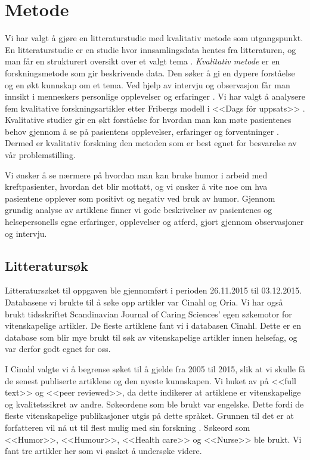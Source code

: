 \chapter{Metode}

Vi har valgt å gjøre en litteraturstudie med kvalitativ metode som
utgangspunkt. En litteraturstudie er en studie hvor innsamlingsdata hentes fra
litteraturen, og man får en strukturert oversikt over et valgt tema
\cite{segesten2006}.  \textit{Kvalitativ metode} er en forskningsmetode som gir
beskrivende data. Den søker å gi en dypere forståelse og en økt kunnskap om et
tema. Ved hjelp av intervju og observasjon får man innsikt i menneskers
personlige opplevelser og erfaringer \cite{olsson2003}. Vi har valgt å
analysere fem kvalitative forskningsartikler etter Fribergs modell i <<Dags för
uppsats>> \citeyear{friberg2006}. Kvalitative studier gir en økt forståelse for
hvordan man kan møte pasientenes behov gjennom å se på pasientens opplevelser,
erfaringer og forventninger \cite{segesten2006}. Dermed er kvalitativ forskning
den metoden som er best egnet for besvarelse av vår problemstilling.

Vi ønsker å se nærmere på hvordan man kan bruke humor i arbeid med
kreftpasienter, hvordan det blir mottatt, og vi ønsker å vite noe om hva
pasientene opplever som positivt og negativ ved bruk av humor. Gjennom grundig
analyse av artiklene finner vi gode beskrivelser av pasientenes og
helsepersonells egne erfaringer, opplevelser og atferd, gjort gjennom
observasjoner og intervju.

\section{Litteratursøk}

Litteratursøket til oppgaven ble gjennomført i perioden 26.11.2015 til
03.12.2015. Databasene vi brukte til å søke opp artikler var Cinahl og Oria. Vi
har også brukt tidsskriftet Scandinavian Journal of Caring Sciences' egen
søkemotor for vitenskapelige artikler. De fleste artiklene fant vi i databasen
Cinahl. Dette er en database som blir mye brukt til søk av vitenskapelige
artikler innen helsefag, og var derfor godt egnet for oss.

I Cinahl valgte vi å begrense søket til å gjelde fra 2005 til 2015, slik at vi
skulle få de senest publiserte artiklene og den nyeste kunnskapen. Vi huket av
på <<full text>> og <<peer reviewed>>, da dette indikerer at artiklene er
vitenskapelige og kvalitetssikret av andre. Søkeordene som ble brukt var
engelske. Dette fordi de fleste vitenskapelige publikasjoner utgis på dette
språket. Grunnen til det er at forfatteren vil nå ut til flest mulig med sin
forskning \cite{friberg2006}. Søkeord som <<Humor>>, <<Humour>>, <<Health
care>> og <<Nurse>> ble brukt. Vi fant tre artikler her som vi ønsket å
undersøke videre.

